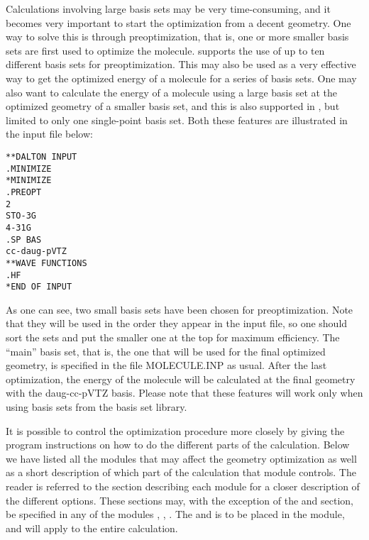 Calculations involving large basis sets may be very time-consuming,
and it becomes very important to start the optimization from a decent
geometry. One way to solve this is through
preoptimization, that is,
one or more smaller basis sets are first used to optimize the
molecule. {\siraba} supports the use of up to ten different basis sets
for preoptimization. This may also be used as a very effective way to
get the optimized energy of a molecule for a series of basis
sets. One may also want to calculate the energy of a molecule using a
large basis set at the optimized geometry of a smaller basis set, and
this is also supported in {\siraba}, but limited to only one single-point
basis set. Both these features are illustrated in the input file below:

\begin{verbatim}
**DALTON INPUT
.MINIMIZE
*MINIMIZE
.PREOPT
2
STO-3G
4-31G
.SP BAS
cc-daug-pVTZ
**WAVE FUNCTIONS
.HF
*END OF INPUT
\end{verbatim}

As one can see, two small basis sets have been chosen for
preoptimization. Note that they will be
used in the order they appear in the input file, so one should
sort the sets and put the smaller one at the top for maximum
efficiency. The ``main'' basis set, that is, the one that will be
used for the final optimized geometry, is specified in the file
MOLECULE.INP as usual. After the last optimization, the energy of
the molecule will be calculated at the final geometry with the
daug-cc-pVTZ basis. Please note that these features will work only
when using basis sets from the basis set library.

It is possible to control the optimization procedure more closely
by giving the program instructions on how to do the different parts of
the calculation. Below we have listed all the modules that may
affect the geometry optimization  as well as a short description of
which part of the calculation that module controls. The reader is
referred to the section describing each module for a closer
description of the different options. These sections may, with the
exception of the  and  section, be specified
in any of the modules , ,
. The  and  is
to be placed in the  module, and will apply to the
entire calculation.

